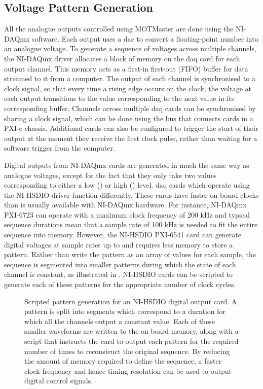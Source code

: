 \subsection{Voltage Pattern Generation}\label{subsec:compinterface_patterngen}
All the analogue outputs controlled using MOTMaster are done using the NI-DAQmx software. Each output uses a \ac{dac} to convert a floating-point number into an analogue voltage. To generate a sequence of voltages across multiple channels, the NI-DAQmx driver allocates a block of memory on the \ac{daq} card for each output channel. This memory acts as a first-in first-out (FIFO) buffer for data streamed to it from a computer. The output of each channel is synchronised to a clock signal, so that every time a rising edge occurs on the clock, the voltage at each output transitions to the value corresponding to the next value in its corresponding buffer. Channels across multiple \ac{daq} cards can be synchronised by sharing a clock signal, which can be done using the bus that connects cards in a PXI-e chassis. Additional cards can also be configured to trigger the start of their output at the moment they receive the first clock pulse, rather than waiting for a software trigger from the computer. \par\noindent 
Digital outputs from NI-DAQmx cards are generated in much the same way as analogue voltages, except for the fact that they only take two values corresponding to either a low () or high () level. \ac{daq} cards which operate using the NI-HSDIO driver function differently. These cards have faster on-board clocks than is usually available with NI-DAQmx hardware. For instance, NI-DAQmx PXI-6723 can operate with a maximum clock frequency of 200 kHz and typical sequence durations mean that a sample rate of 100 kHz is needed to fit the entire sequence into memory. However, the NI-HSDIO PXI-6541 card can generate digital voltages at sample rates up to  and requires less memory to store a pattern. Rather than write the pattern as an array of values for each sample, the sequence is segmented into smaller patterns during which the state of each channel is constant, as illustrated in . NI-HSDIO cards can be scripted to generate each of these patterns for the appropriate number of clock cycles.
\begin{figure}
    \centering
    
    \caption[Scripted pattern generation for an NI-HSDIO card]{Scripted pattern generation for an NI-HSDIO digital output card. A pattern is split into segments which correspond to a duration for which all the channels output a constant value. Each of these smaller waveforms are written to the on-board memory, along with a script that instructs the card to output each pattern for the required number of times to reconstruct the original sequence. By reducing the amount of memory required to define the sequence, a faster clock frequency and hence timing resolution can be used to output digital control signals.}\label{fig:hsdio_timing}
\end{figure}
